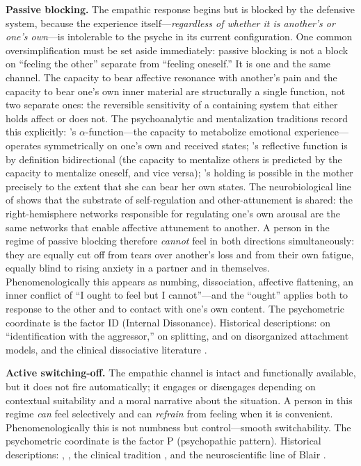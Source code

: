 \textbf{Passive blocking.} The empathic response begins but is blocked by the defensive system, because the experience itself---\emph{regardless of whether it is another's or one's own}---is intolerable to the psyche in its current configuration. One common oversimplification must be set aside immediately: passive blocking is not a block on ``feeling the other'' separate from ``feeling oneself.'' It is one and the same channel. The capacity to bear affective resonance with another's pain and the capacity to bear one's own inner material are structurally a single function, not two separate ones: the reversible sensitivity of a containing system that either holds affect or does not. The psychoanalytic and mentalization traditions record this explicitly: \citet{bion1962}'s $\alpha$-function---the capacity to metabolize emotional experience---operates symmetrically on one's own and received states; \citet{fonagy2002}'s reflective function is by definition bidirectional (the capacity to mentalize others is predicted by the capacity to mentalize oneself, and vice versa); \citet{winnicott1965}'s holding is possible in the mother precisely to the extent that she can bear her own states. The neurobiological line of \citet{schore2001} shows that the substrate of self-regulation and other-attunement is shared: the right-hemisphere networks responsible for regulating one's own arousal are the same networks that enable affective attunement to another. A person in the regime of passive blocking therefore \emph{cannot} feel in both directions simultaneously: they are equally cut off from tears over another's loss and from their own fatigue, equally blind to rising anxiety in a partner and in themselves. Phenomenologically this appears as numbing, dissociation, affective flattening, an inner conflict of ``I ought to feel but I cannot''---and the ``ought'' applies both to response to the other and to contact with one's own content. The psychometric coordinate is the factor ID (Internal Dissonance). Historical descriptions: \citet{ferenczi1933} on ``identification with the aggressor,'' \citet{klein1946} on splitting, \citet{bowlby1969} and \citet{main1986} on disorganized attachment models, and the clinical dissociative literature \citep{putnam1997, vanderkolk2014}.

\textbf{Active switching-off.} The empathic channel is intact and functionally available, but it does not fire automatically; it engages or disengages depending on contextual suitability and a moral narrative about the situation. A person in this regime \emph{can} feel selectively and can \emph{refrain} from feeling when it is convenient. Phenomenologically this is not numbness but control---smooth switchability. The psychometric coordinate is the factor P (psychopathic pattern). Historical descriptions: \citet{cleckley1941}, \citet{karpman1941}, the clinical tradition \citep{hare1991, lilienfeld1990}, and the neuroscientific line of Blair \citep{blair1995, blair2013}.

